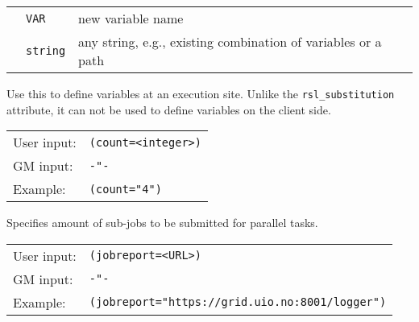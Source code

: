  \begin{tabular}{llp{10cm}}
    \hspace*{1cm}&\texttt{VAR} & new variable name\\
    \hspace*{1cm}&\texttt{string} & any string, e.g., existing combination of
    variables or a path\\
  \end{tabular}

  Use this to define variables at an execution site. Unlike the
  \texttt{rsl\_substitution} attribute, it can not be used to define
  variables on the client side.



  \hspace*{0.5cm}
  \begin{shaded}
  \end{shaded}
  \begin{tabular}{lp{13cm}}
    User input:&\verb#(count=<integer>)#\\
    GM input:&\verb#-"-#\\
    Example:&\verb#(count="4")#\\
  \end{tabular}

  Specifies amount of sub-jobs to be submitted for parallel tasks.

  \hspace*{0.5cm}
  \begin{shaded}
  \end{shaded}
  \begin{tabular}{lp{13cm}}
    User input:&\verb#(jobreport=<URL>)#\\
    GM input:&\verb#-"-#\\
    Example:&\verb#(jobreport="https://grid.uio.no:8001/logger")#\\
  \end{tabular}


